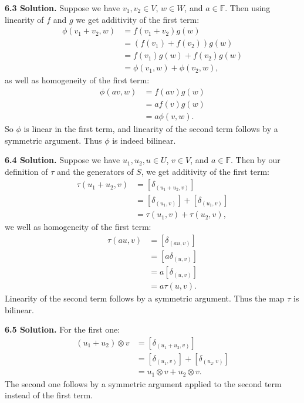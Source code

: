 \textbf{6.3 Solution.} Suppose we have $v_1, v_2 \in V$, $w \in W$, and $a \in \mathbb{F}$. Then using linearity of $f$ and $g$ we get additivity of the first term:
\begin{align*}
    \phi(v_1+v_2, w) &= f(v_1+v_2)g(w) \\
                     &= (f(v_1) + f(v_2))g(w) \\
                     &= f(v_1)g(w) + f(v_2)g(w) \\
                     &= \phi(v_1, w) + \phi(v_2, w),
\end{align*}
as well as homogeneity of the first term:
\begin{align*}
    \phi(av, w) &= f(av)g(w) \\
                &= af(v)g(w) \\
                &= a\phi(v, w).
\end{align*}
So $\phi$ is linear in the first term, and linearity of the second term follows by a symmetric argument. Thus $\phi$ is indeed bilinear.

\textbf{6.4 Solution.} Suppose we have $u_1, u_2, u \in U$, $v \in V$, and $a \in \mathbb{F}$. Then by our definition of $\tau$ and the generators of $S$, we get additivity of the first term:
\begin{align*}
    \tau(u_1+u_2, v) &= [\delta_{(u_1+u_2, v)}] \\
                  &= [\delta_{(u_1, v)}] + [\delta_{(u_1, v)}] \\
                  &= \tau(u_1, v) + \tau(u_2, v),
\end{align*}
we well as homogeneity of the first term:
\begin{align*}
    \tau(au, v) &= [\delta_{(au, v)}] \\
                &= [a\delta_{(u, v)}] \\
                &= a[\delta_{(u, v)}] \\
                &= a\tau(u, v).
\end{align*}
Linearity of the second term follows by a symmetric argument. Thus the map $\tau$ is bilinear.

\textbf{6.5 Solution.} For the first one:
\begin{align*}
    (u_1 + u_2) \otimes v &= [\delta_{(u_1+u_2, v)}] \\
        &= [\delta_{(u_1, v)}] + [\delta_{(u_2, v)}] \\
        &= u_1 \otimes v + u_2 \otimes v.
\end{align*}
The second one follows by a symmetric argument applied to the second term instead of the first term.

